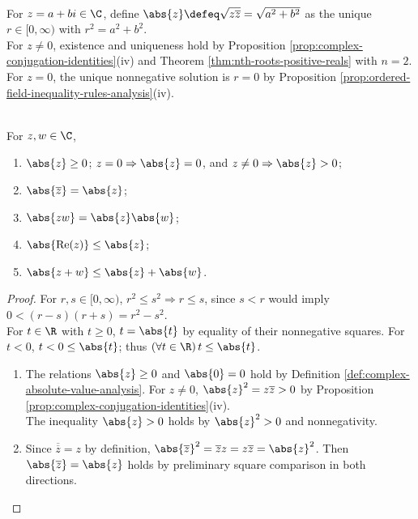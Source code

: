 \begin{definition} \label{def:complex-absolute-value-analysis} \\
For $z=a+bi\in\C$, define $\abs{z}\defeq\sqrt{z\overline{z}}=\sqrt{a^2+b^2}$ as the unique $r\in[0,\infty)$ with $r^2=a^2+b^2$.\\
For $z\neq0$, existence and uniqueness hold by Proposition \ref{prop:complex-conjugation-identities}(iv) and Theorem \ref{thm:nth-roots-positive-reals} with $n=2$.\\
For $z=0$, the unique nonnegative solution is $r=0$ by Proposition \ref{prop:ordered-field-inequality-rules-analysis}(iv).
\end{definition}

\begin{theorem} \label{thm:complex-absolute-value-identities} \\
For $z,w\in\C$,
\begin{enumerate}[label=(\roman*)]
\setlength{\itemsep}{0pt}
\item $\abs{z}\geq0$; $z=0\Rightarrow\abs{z}=0$, and $z\neq0\Rightarrow\abs{z}>0$;
\item $\abs{\overline{z}}=\abs{z}$;
\item $\abs{zw}=\abs{z}\abs{w}$;
\item $\abs{\operatorname{Re}(z)}\leq\abs{z}$;
\item $\abs{z+w}\leq\abs{z}+\abs{w}$.
\end{enumerate}
\begin{proof}
For $r,s\in[0,\infty)$, $r^2\leq s^2\Rightarrow r\leq s$, since $s<r$ would imply $0<(r-s)(r+s)=r^2-s^2$.\\
For $t\in\R$ with $t\geq0$, $t=\abs{t}$ by equality of their nonnegative squares. For $t<0$, $t<0\leq\abs{t}$; thus $(\forall t\in\R)\,t\leq\abs{t}$.
\begin{enumerate}[label=(\roman*)]
\setlength{\itemsep}{0pt}
\item The relations $\abs{z}\geq0$ and $\abs{0}=0$ hold by Definition \ref{def:complex-absolute-value-analysis}. For $z\neq0$, $\abs{z}^2=z\overline{z}>0$ by Proposition \ref{prop:complex-conjugation-identities}(iv).\\
The inequality $\abs{z}>0$ holds by $\abs{z}^2>0$ and nonnegativity.
\item Since $\overline{\overline{z}}=z$ by definition, $\abs{\overline{z}}^2=\overline{z}z=z\overline{z}=\abs{z}^2$. Then $\abs{\overline{z}}=\abs{z}$ holds by preliminary square comparison in both directions.

\end{enumerate}
\end{proof}
\end{theorem}

